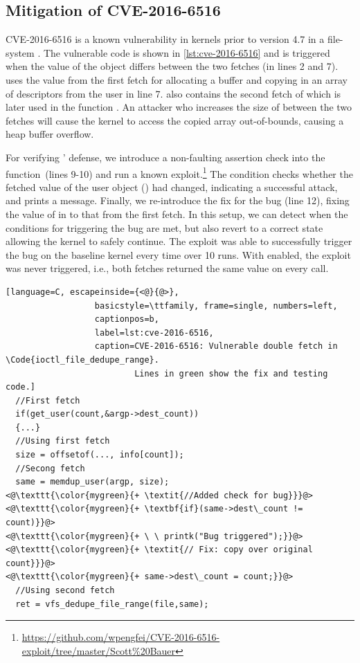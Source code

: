\documentclass[letterpaper,twocolumn,10pt]{article}
\begin{document}
\subsection{Mitigation of CVE-2016-6516}

CVE-2016-6516 is a known vulnerability in kernels prior to version
4.7 in a file-system . 
The vulnerable code is shown in \autoref{lst:cve-2016-6516} and is 
triggered when the value of the  object differs between 
the two fetches (in lines 2 and 7).
 uses the value from the first fetch for allocating a buffer
and copying in an array of descriptors from the user in line 7.
 also contains the second fetch of 
which is later used in the function .
An attacker who increases the size of  between the 
two fetches will cause the kernel to access the copied array out-of-bounds,
causing a heap buffer overflow.

For verifying \midas' defense, we introduce a non-faulting assertion 
check into the function~(lines 9-10) and run a known 
exploit.\footnote{\url{https://github.com/wpengfei/CVE-2016-6516-exploit/tree/master/Scott\%20Bauer}}
The condition checks whether the fetched value of the user object ()
had changed, indicating a successful attack, and prints a message.
Finally, we re-introduce the fix for the bug (line 12), fixing the value of 
 in  to that from the first fetch.
In this setup, we can detect when the conditions for triggering the bug are met, 
but also revert to a correct state allowing the kernel to safely
continue.
The exploit was able to successfully trigger the bug on the baseline kernel
every time over 10 runs.
With \midas enabled, the exploit was never triggered, i.e., both fetches 
returned the same value on every call.\\


\begin{minipage}{\linewidth}
\begin{lstlisting}[language=C, escapeinside={<@}{@>}, 
                  basicstyle=\ttfamily, frame=single, numbers=left, 
                  captionpos=b,
                  label=lst:cve-2016-6516,
                  caption=CVE-2016-6516: Vulnerable double fetch in \Code{ioctl_file_dedupe_range}. 
                          Lines in green show the fix and testing code.]
  //First fetch
  if(get_user(count,&argp->dest_count)) 
  {...}
  //Using first fetch
  size = offsetof(..., info[count]);
  //Secong fetch
  same = memdup_user(argp, size);
<@\texttt{\color{mygreen}{+ \textit{//Added check for bug}}}@>
<@\texttt{\color{mygreen}{+ \textbf{if}(same->dest\_count != count)}}@>
<@\texttt{\color{mygreen}{+ \ \ printk("Bug triggered");}}@>
<@\texttt{\color{mygreen}{+ \textit{// Fix: copy over original count}}}@>
<@\texttt{\color{mygreen}{+ same->dest\_count = count;}}@>
  //Using second fetch
  ret = vfs_dedupe_file_range(file,same);
\end{lstlisting}
\end{minipage}
\end{document}

